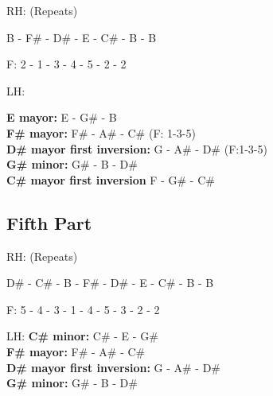 RH: (Repeats)

B - F\# - D\# - E - C\# - B - B

F: 2 - 1 - 3 - 4 - 5 - 2 - 2

LH:

\textbf{E mayor:} E - G\# - B\\
\textbf{F\# mayor:} F\# - A\# - C\# (F: 1-3-5) \\
\textbf{D\# mayor first inversion:} G - A\# - D\# (F:1-3-5)\\
\textbf{G\# minor:} G\# - B - D\#\\
\textbf{C\# mayor first inversion} F - G\# - C\#

\subsection{Fifth Part}

RH: (Repeats)

D\# - C\# - B - F\# - D\# - E - C\# - B - B

F: 5 - 4 - 3 - 1 - 4 - 5 - 3 - 2 - 2

LH: 
\textbf{C\# minor:} C\# - E - G\#\\
\textbf{F\# mayor:} F\# - A\# - C\#\\
\textbf{D\# mayor first inversion:} G - A\# - D\#\\
\textbf{G\# minor:} G\# - B - D\#
